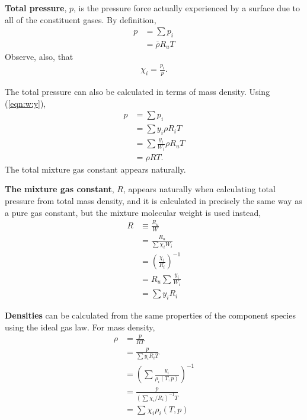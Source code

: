 {\bf Total pressure}, $p$, is the pressure force actually experienced by a surface due to all of the constituent gases.  By definition, 
\begin{align}
p &= \sum p_i \nonumber\\
 &= \overline{\rho} R_u T
\end{align}
Observe, also, that 
\begin{align}
\chi_i = \frac{p_i}{p}.
\end{align}

The total pressure can also be calculated in terms of mass density.  Using (\ref{eqn:w:y}),
\begin{align}
p &= \sum p_i \nonumber\\
 &= \sum y_i \rho R_i T\nonumber\\
 &= \sum \frac{y_i}{W_i} \rho R_u T\nonumber\\
 &= \rho R T.
\end{align}
The total mixture gas constant appears naturally.

{\bf The mixture gas constant}, $R$, appears naturally when calculating total pressure from total mass density, and it is calculated in precisely the same way as a pure gas constant, but the mixture molecular weight is used instead,
\begin{subequations}
\begin{align}
R &\equiv \frac{R_u}{W}\\
 &= \frac{R_u}{\sum \chi_i W_i}\nonumber\\
 &= \left( \frac{\chi_i}{R_i} \right)^{-1}\\
 &= R_u \sum \frac{y_i}{W_i}\nonumber\\
 &= \sum y_i R_i
\end{align}
\end{subequations}

{\bf Densities} can be calculated from the same properties of the component species using the ideal gas law.  For mass density,
\begin{subequations}
\begin{align}
\rho &= \frac{p}{R T}\nonumber\\
 &= \frac{p}{\sum y_i R_i T}\nonumber\\
 &= \left(\sum \frac{y_i}{\rho_i(T,p)} \right)^{-1}\\
 &= \frac{p}{\left(\sum \chi_i / R_i\right)^{-1} T}\nonumber\\
 &= \sum \chi_i \rho_i(T,p)
\end{align}
\end{subequations}

